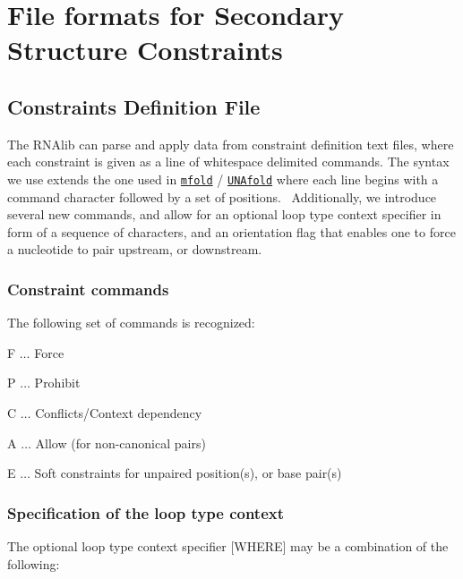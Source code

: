 \hypertarget{file_formats_constraint-formats}{}\section{File formats for Secondary Structure Constraints}\label{file_formats_constraint-formats}
\hypertarget{file_formats_constraint-formats-file}{}\subsection{Constraints Definition File}\label{file_formats_constraint-formats-file}
The R\+N\+Alib can parse and apply data from constraint definition text files, where each constraint is given as a line of whitespace delimited commands. The syntax we use extends the one used in \href{http://mfold.rna.albany.edu/?q=mfold}{\tt mfold} / \href{http://mfold.rna.albany.edu/?q=DINAMelt/software}{\tt U\+N\+Afold} where each line begins with a command character followed by a set of positions.~\newline
 Additionally, we introduce several new commands, and allow for an optional loop type context specifier in form of a sequence of characters, and an orientation flag that enables one to force a nucleotide to pair upstream, or downstream.\hypertarget{file_formats_const_file_commands}{}\subsubsection{Constraint commands}\label{file_formats_const_file_commands}
The following set of commands is recognized\+:
\begin{DoxyItemize}
\item {\ttfamily F} $ \ldots $ Force
\item {\ttfamily P} $ \ldots $ Prohibit
\item {\ttfamily C} $ \ldots $ Conflicts/\+Context dependency
\item {\ttfamily A} $ \ldots $ Allow (for non-\/canonical pairs)
\item {\ttfamily E} $ \ldots $ Soft constraints for unpaired position(s), or base pair(s)
\end{DoxyItemize}\hypertarget{file_formats_const_file_loop_types}{}\subsubsection{Specification of the loop type context}\label{file_formats_const_file_loop_types}
The optional loop type context specifier {\ttfamily }\mbox{[}W\+H\+E\+RE\mbox{]} may be a combination of the following\+:
